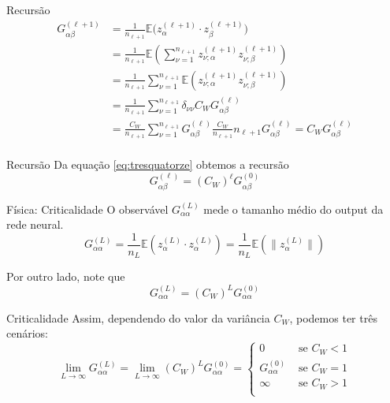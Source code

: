 \documentclass{beamer}
\newcommand{\EE}{\mathbb{E}}
\newcommand{\aaA}{\alpha}
\newcommand{\aaB}{\beta}
\begin{document}
\begin{frame}{Recursão}
	\begin{align*}\tag{3.14}\label{eq:tresquatorze}
		G^{(\ell+1)}_{\aaA\aaB} &= \frac{1}{n_{\ell+1}}\EE\big(z^{(\ell+1)}_{\aaA}\cdot z^{(\ell+1)}_{\aaB}\big) \\
		&= \frac{1}{n_{\ell+1}}\EE\left(\sum_{\nu=1}^{n_{\ell+1}}z^{(\ell+1)}_{\nu;\aaA} z^{(\ell+1)}_{\nu;\aaB}\right) \\
		&= \frac{1}{n_{\ell+1}}\sum_{\nu=1}^{n_{\ell+1}} \EE\left(z^{(\ell+1)}_{\nu;\aaA} z^{(\ell+1)}_{\nu;\aaB}\right) \\
		&= \frac{1}{n_{\ell+1}}\sum_{\nu=1}^{n_{\ell+1}} \delta_{\nu\nu}C_WG^{(\ell)}_{\aaA\aaB} \\
		&= \frac{C_W}{n_{\ell+1}}\sum_{\nu=1}^{n_{\ell+1}} G^{(\ell)}_{\aaA\aaB}\frac{C_W}{n_{\ell+1}}n_{\ell+1}G^{(\ell)}_{\aaA\aaB} = C_WG^{(\ell)}_{\aaA\aaB}\\ 
	\end{align*}
\end{frame}

\begin{frame}{Recursão}
	Da equação \eqref{eq:tresquatorze} obtemos a recursão
	\begin{equation*}\tag{3.15}\label{eq:trezquinze}
		G^{(\ell)}_{\aaA\aaB} = (C_W)^{\ell}G^{(0)}_{\aaA\aaB}
	\end{equation*}
\end{frame}

\begin{frame}{Física: Criticalidade}
	O observável $G^{(L)}_{\aaA\aaA}$ mede o tamanho médio do output da rede neural.
	\begin{equation*}\tag{3.16}
		G^{(L)}_{\aaA\aaA} = \frac{1}{n_L}\EE\left(z^{(L)}_\aaA\cdot z^{(L)}_\aaA\right) =  \frac{1}{n_L}\EE\left(\big\|z^{(L)}_\aaA\big\|\right)
	\end{equation*}

	Por outro lado, note que 
	$$G^{(L)}_{\aaA\aaA} = (C_W)^LG^{(0)}_{\aaA\aaA}$$
\end{frame}

\begin{frame}{Criticalidade}
	Assim, dependendo do valor da variância $C_W$, podemos ter três cenários:
	\begin{equation*}
		\lim_{L\to\infty} G^{(L)}_{\aaA\aaA} = \lim_{L\to\infty} (C_W)^LG^{(0)}_{\aaA\aaA} =
	\begin{cases}
		0  &\text{ se } C_W < 1  \\
		G^{(0)}_{\aaA\aaA}&\text{ se }  C_W = 1 \\
		\infty &\text{ se  } C_W>1\\
	\end{cases}
	\end{equation*}
\end{frame}
\end{document}

